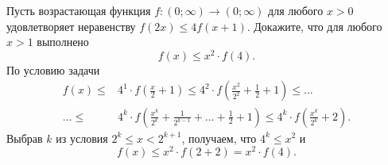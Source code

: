 \problem
Пусть возрастающая функция $f \colon (0; \infty) \to (0; \infty)$ для любого
$x > 0$ удовлетворяет неравенству $f(2 x) \leq  4 f(x + 1)$.
Докажите, что для любого $x > 1$ выполнено
\[
    f(x) \leq x^2 \cdot f(4)
.\]
\solution
По условию задачи
\begin{align*}
    f(x)
\leq{}&
    4^1 \cdot f\left( \frac{x}{2} + 1 \right)
\leq
    4^2 \cdot f\left( \frac{x^2}{2^2} + \frac{1}{2} + 1 \right)
\leq\ldots\\\ldots\leq{}&
    4^k
    \cdot
    f\left(
        \frac{x^k}{2^k} + \frac{1}{2^{k-1}} + \ldots + \frac{1}{2} + 1
    \right)
\leq
    4^k \cdot f\left( \frac{x^k}{2^k} + 2 \right)
.\end{align*}
Выбрав $k$ из условия $2^k \leq x < 2^{k + 1}$, получаем, что $4^k \leq x^2$ и
\[
    f(x) \leq x^2 \cdot f(2 + 2) = x^2 \cdot f(4)
.\]
\endproblem
